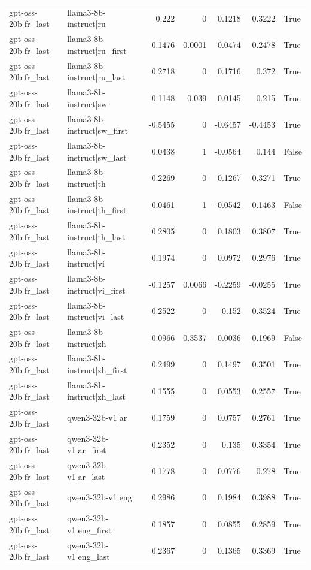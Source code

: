 \begin{table}
\begin{tabular}{l l r r r r l}
gpt-oss-20b|fr_last & llama3-8b-instruct|ru & 0.222 & 0 & 0.1218 & 0.3222 & True \\
gpt-oss-20b|fr_last & llama3-8b-instruct|ru_first & 0.1476 & 0.0001 & 0.0474 & 0.2478 & True \\
gpt-oss-20b|fr_last & llama3-8b-instruct|ru_last & 0.2718 & 0 & 0.1716 & 0.372 & True \\
gpt-oss-20b|fr_last & llama3-8b-instruct|sw & 0.1148 & 0.039 & 0.0145 & 0.215 & True \\
gpt-oss-20b|fr_last & llama3-8b-instruct|sw_first & -0.5455 & 0 & -0.6457 & -0.4453 & True \\
gpt-oss-20b|fr_last & llama3-8b-instruct|sw_last & 0.0438 & 1 & -0.0564 & 0.144 & False \\
gpt-oss-20b|fr_last & llama3-8b-instruct|th & 0.2269 & 0 & 0.1267 & 0.3271 & True \\
gpt-oss-20b|fr_last & llama3-8b-instruct|th_first & 0.0461 & 1 & -0.0542 & 0.1463 & False \\
gpt-oss-20b|fr_last & llama3-8b-instruct|th_last & 0.2805 & 0 & 0.1803 & 0.3807 & True \\
gpt-oss-20b|fr_last & llama3-8b-instruct|vi & 0.1974 & 0 & 0.0972 & 0.2976 & True \\
gpt-oss-20b|fr_last & llama3-8b-instruct|vi_first & -0.1257 & 0.0066 & -0.2259 & -0.0255 & True \\
gpt-oss-20b|fr_last & llama3-8b-instruct|vi_last & 0.2522 & 0 & 0.152 & 0.3524 & True \\
gpt-oss-20b|fr_last & llama3-8b-instruct|zh & 0.0966 & 0.3537 & -0.0036 & 0.1969 & False \\
gpt-oss-20b|fr_last & llama3-8b-instruct|zh_first & 0.2499 & 0 & 0.1497 & 0.3501 & True \\
gpt-oss-20b|fr_last & llama3-8b-instruct|zh_last & 0.1555 & 0 & 0.0553 & 0.2557 & True \\
gpt-oss-20b|fr_last & qwen3-32b-v1|ar & 0.1759 & 0 & 0.0757 & 0.2761 & True \\
gpt-oss-20b|fr_last & qwen3-32b-v1|ar_first & 0.2352 & 0 & 0.135 & 0.3354 & True \\
gpt-oss-20b|fr_last & qwen3-32b-v1|ar_last & 0.1778 & 0 & 0.0776 & 0.278 & True \\
gpt-oss-20b|fr_last & qwen3-32b-v1|eng & 0.2986 & 0 & 0.1984 & 0.3988 & True \\
gpt-oss-20b|fr_last & qwen3-32b-v1|eng_first & 0.1857 & 0 & 0.0855 & 0.2859 & True \\
gpt-oss-20b|fr_last & qwen3-32b-v1|eng_last & 0.2367 & 0 & 0.1365 & 0.3369 & True \\

\end{tabular}
\end{table}
